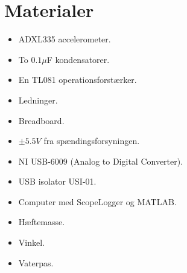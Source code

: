 \section{Materialer}
\begin{itemize}
\item ADXL335 accelerometer.
\item To $0.1\mu$F kondensatorer.
\item En TL081 operationsforstærker.
\item Ledninger.
\item Breadboard.
\item $\pm5.5V$ fra spændingsforsyningen.
\item NI USB-6009 (Analog to Digital Converter).
\item USB isolator USI-01.
\item Computer med ScopeLogger og MATLAB.
\item Hæftemasse.
\item Vinkel.
\item Vaterpas.
\end{itemize}

